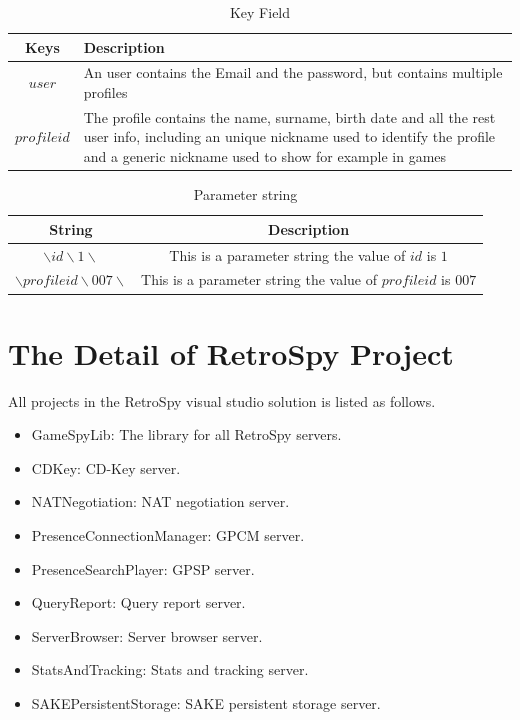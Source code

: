 \documentclass[oneside,titlepage,a4paper]{Definition/retrospy} %
\begin{document}
\begin{table}[H]
	\centering
	\begin{tabular}{|c|>{\centering\arraybackslash}p{8cm}|}
		\hline 
		\textbf{Keys}& \textbf{Description}  \\ 
		\hline 
		$user$ & An user contains the Email and the password, but contains multiple profiles \\ 		
		\hline 
		$profileid$ & The profile contains the name, surname, birth date and all the rest user info, including
		an unique nickname used to identify the profile and a generic nickname used to show for example in
		games \\
		\hline 
	\end{tabular} 
	\caption{Key Field}
	\label{Key Field}	
\end{table}

\begin{table}[H]
	\centering
	\begin{tabular}{|c|c|}
		\hline 
		\textbf{String}&\textbf{Description}  \\ 
		\hline 
		$ \backslash id \backslash 1 \backslash $& This is a parameter string the value of $ id $ is $ 1 $ \\ 		
		\hline 
		$ \backslash profileid \backslash 007 \backslash $ & This is a parameter string the value of $ profileid $ is $ 007 $ \\
		\hline
	\end{tabular} 
	\caption{Parameter string}
	\label{Parameter string}
\end{table}

\chapter{The Detail of RetroSpy Project}
All projects in the RetroSpy visual studio solution is listed as follows.
\begin{itemize}
	\item GameSpyLib: The library for all RetroSpy servers.
	\item CDKey: CD-Key server.
	\item NATNegotiation: NAT negotiation server.
	\item PresenceConnectionManager: GPCM server.
	\item PresenceSearchPlayer:  GPSP server.
	\item QueryReport: Query report server.
	\item ServerBrowser: Server browser server.
	\item StatsAndTracking: Stats and tracking server.
	\item SAKEPersistentStorage: SAKE persistent storage server.
\end{itemize}
\end{document}
